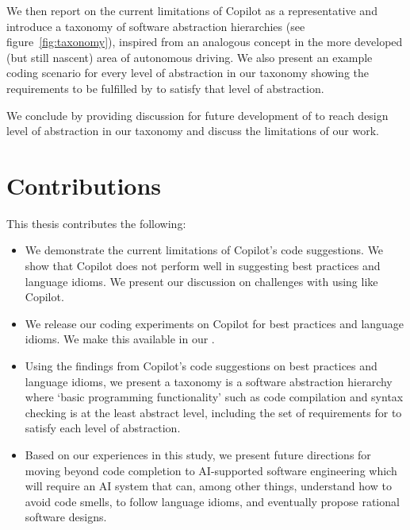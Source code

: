 We then report on the current limitations of Copilot as a representative \cct{} and introduce a taxonomy of software abstraction hierarchies (see figure~\ref{fig:taxonomy}), inspired from an analogous concept in the more developed (but still nascent) area of autonomous driving. 
We also present an example coding scenario for every level of abstraction in our taxonomy showing the requirements to be fulfilled by \cct{} to satisfy that level of abstraction.

We conclude by providing discussion for future development of \cct{} to reach design level of abstraction in our taxonomy and discuss the limitations of our work. 

\section{Contributions}

This thesis contributes the following:

\begin{itemize}
    \item We demonstrate the current limitations of Copilot's code suggestions. We show that Copilot does not perform well in suggesting best practices and language idioms. We present our discussion on challenges with using \cct{} like Copilot.
    \item We release our coding experiments on Copilot for best practices and language idioms. We make this available in our \repl{}.
    \item Using the findings from Copilot's code suggestions on best practices and language idioms, we present a taxonomy is a software abstraction hierarchy where ‘basic programming functionality’ such as code compilation and syntax checking is at the least abstract level, including the set of requirements for \cct{} to satisfy each level of abstraction.
    \item Based on our experiences in this study, we present future directions for moving beyond code completion to AI-supported software engineering which will require an AI system that can, among other things, understand how to avoid code smells, to follow language idioms, and eventually propose rational software designs.
\end{itemize}